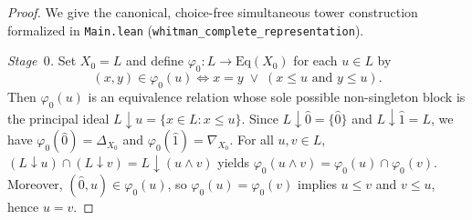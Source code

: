 \documentclass[11pt]{article}
\theoremstyle{definition}
\theoremstyle{remark}
\newcommand{\Eq}{\mathrm{Eq}}
\begin{document}
\begin{proof}
We give the canonical, choice-free simultaneous tower construction formalized in \texttt{Main.lean} (\texttt{whitman\_complete\_representation}).

\emph{Stage~$0$.} Set $X_0 = L$ and define $\varphi_0 \colon L \to \Eq(X_0)$ for each $u \in L$ by
\[
  (x, y) \in \varphi_0(u) \iff x = y \;\lor\; (x \le u \text{ and } y \le u).
\]
Then $\varphi_0(u)$ is an equivalence relation whose sole possible non-singleton block is the principal ideal $L \downarrow u = \{x \in L : x \le u\}$. Since $L \downarrow \hat{0} = \{\hat{0}\}$ and $L \downarrow \hat{1} = L$, we have $\varphi_0(\hat{0}) = \Delta_{X_0}$ and $\varphi_0(\hat{1}) = \nabla_{X_0}$. For all $u, v \in L$, $(L \downarrow u) \cap (L \downarrow v) = L \downarrow (u \wedge v)$ yields $\varphi_0(u \wedge v) = \varphi_0(u) \cap \varphi_0(v)$. Moreover, $(\hat{0}, u) \in \varphi_0(u)$, so $\varphi_0(u) = \varphi_0(v)$ implies $u \le v$ and $v \le u$, hence $u = v$.


\end{proof}
\end{document}
